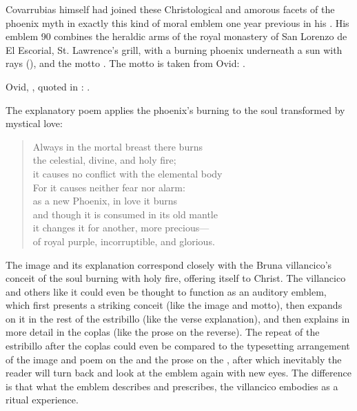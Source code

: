 
Covarrubias himself had joined these Christological and amorous facets of the
phoenix myth in exactly this kind of moral emblem one year previous in his
.
His emblem 90 combines the heraldic arms of the royal monastery of San Lorenzo
de El Escorial, St. Lawrence's grill, with a burning phoenix underneath a sun
with rays (), and the motto .%
    \Autocite[]{Covarrubias:Emblemas}
The motto is taken from Ovid: .%
\begin{Footnote}
    Ovid, , quoted in
    \autocite[290v]{Covarrubias:Emblemas}: .
\end{Footnote}
The explanatory poem applies the phoenix's burning to the soul transformed by
mystical love:
\begin{quoting}
\begin{verse}
Always in the mortal breast there burns\\
the celestial, divine, and holy fire;\\ 
it causes no conflict with the elemental body\\
For it causes neither fear nor alarm:\\
as a new Phoenix, in love it burns\\
and though it is consumed in its old mantle\\
it changes it for another, more precious---\\
of royal purple, incorruptible, and glorious.
\end{verse}
\end{quoting}
The image and its explanation correspond closely with the Bruna villancico's
conceit of the soul burning with holy fire, offering itself to Christ.
The villancico and others like it could even be thought to function as an
auditory emblem, which first presents a striking conceit (like the image and
motto), then expands on it in the rest of the estribillo (like the verse
explanation), and then explains in more detail in the coplas (like the prose on
the reverse).
The repeat of the estribillo after the coplas could even be compared to the
typesetting arrangement of the image and poem on the  and the prose
on the , after which inevitably the reader will turn back and look
at the emblem again with new eyes.
The difference is that what the emblem describes and prescribes, the villancico
embodies as a ritual experience.


